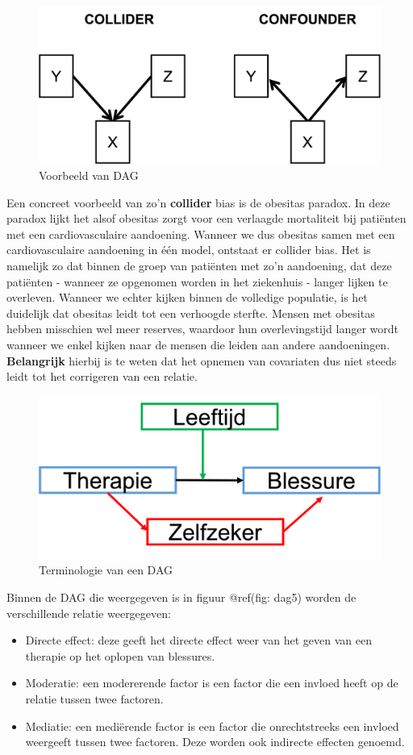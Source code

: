 \documentclass[
]{book}
\providecommand{\tightlist}{%
  \setlength{\itemsep}{0pt}\setlength{\parskip}{0pt}}
\theoremstyle{definition}
\theoremstyle{definition}
\theoremstyle{definition}
\theoremstyle{definition}
\theoremstyle{remark}
\begin{document}
\begin{figure}
\includegraphics[width=0.75\linewidth]{img/dag4} \caption{Voorbeeld van DAG}\label{fig:dag4}
\end{figure}

Een concreet voorbeeld van zo'n \textbf{collider} bias is de obesitas paradox. In deze paradox lijkt het alsof obesitas zorgt voor een verlaagde mortaliteit bij patiënten met een cardiovasculaire aandoening. Wanneer we dus obesitas samen met een cardiovasculaire aandoening in één model, ontstaat er collider bias. Het is namelijk zo dat binnen de groep van patiënten met zo'n aandoening, dat deze patiënten - wanneer ze opgenomen worden in het ziekenhuis - langer lijken te overleven. Wanneer we echter kijken binnen de volledige populatie, is het duidelijk dat obesitas leidt tot een verhoogde sterfte. Mensen met obesitas hebben misschien wel meer reserves, waardoor hun overlevingstijd langer wordt wanneer we enkel kijken naar de mensen die leiden aan andere aandoeningen. \textbf{Belangrijk} hierbij is te weten dat het opnemen van covariaten dus niet steeds leidt tot het corrigeren van een relatie.

\begin{figure}
\includegraphics[width=0.75\linewidth]{img/dag5} \caption{Terminologie van een DAG}\label{fig:dag5}
\end{figure}

Binnen de DAG die weergegeven is in figuur @ref(fig: dag5) worden de verschillende relatie weergegeven:

\begin{itemize}
\tightlist
\item
  {Directe effect}: deze geeft het directe effect weer van het geven van een therapie op het oplopen van blessures.
\item
  {Moderatie}: een modererende factor is een factor die een invloed heeft op de relatie tussen twee factoren.
\item
  {Mediatie}: een mediërende factor is een factor die onrechtstreeks een invloed weergeeft tussen twee factoren. Deze worden ook indirecte effecten genoemd.
\end{itemize}
\end{document}
